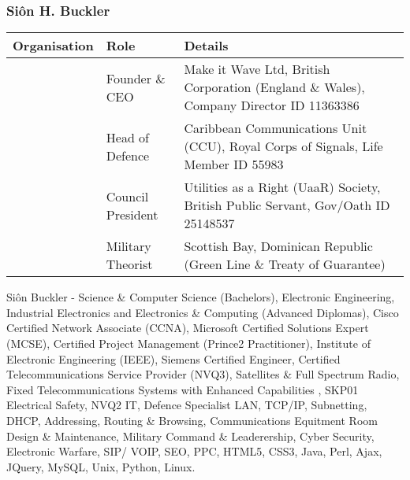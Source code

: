 \documentclass[letterpaper,10pt,openany,oneside,english]{sphinxmanual}
\begin{document}
\subsubsection{Siôn H. Buckler}
\label{\detokenize{index:sion-h-buckler}}

\begin{savenotes}\sphinxattablestart
\centering
\begin{tabulary}{\linewidth}[t]{|T|T|T|}
\hline
\sphinxstyletheadfamily 
Organisation
&\sphinxstyletheadfamily 
Role
&\sphinxstyletheadfamily 
Details
\\
\hline
\noindent{}
&
Founder \& CEO
&
Make it Wave Ltd, British Corporation (England \& Wales), Company Director ID 11363386
\\
\hline
\noindent{}
&
Head of Defence
&
Caribbean Communications Unit (CCU), Royal Corps of Signals, Life Member ID 55983
\\
\hline
\noindent{}
&
Council President
&
Utilities as a Right (UaaR) Society, British Public Servant, Gov/Oath ID 25148537
\\
\hline
\noindent{}
&
Military Theorist
&
Scottish Bay, Dominican Republic (Green Line \& Treaty of Guarantee)
\\
\hline
\end{tabulary}
\par
\sphinxattableend\end{savenotes}

 Siôn Buckler - Science \& Computer Science (Bachelors), Electronic Engineering, Industrial Electronics and Electronics \& Computing (Advanced Diplomas), Cisco Certified Network Associate (CCNA), Microsoft Certified Solutions Expert (MCSE), Certified Project Management (Prince2 Practitioner), Institute of Electronic Engineering (IEEE), Siemens Certified Engineer, Certified Telecommunications Service Provider (NVQ3), Satellites \& Full Spectrum Radio, Fixed Telecommunications Systems with Enhanced Capabilities , SKP01 Electrical Safety, NVQ2 IT, Defence Specialist LAN, TCP/IP, Subnetting, DHCP, Addressing, Routing \& Browsing, Communications Equitment Room Design \& Maintenance, Military Command \& Leaderership,  Cyber Security, Electronic Warfare, SIP/ VOIP, SEO, PPC, HTML5, CSS3, Java, Perl, Ajax, JQuery, MySQL, Unix, Python, Linux.
\end{document}
